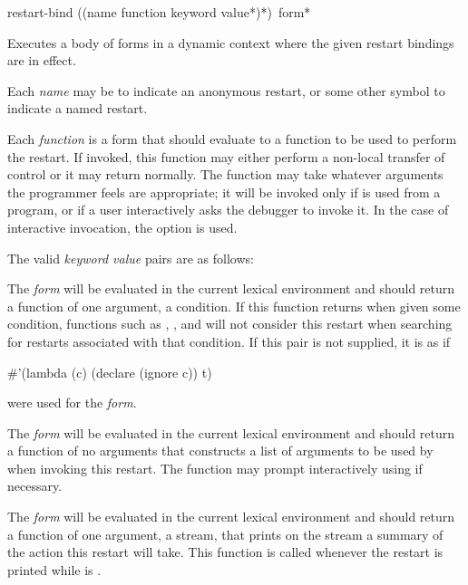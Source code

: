 \begin{defmac}
restart-bind ({(name function {keyword value}*)}*) {\,form}*

  Executes a body of forms in a dynamic context where the given restart
  bindings are in effect.

  Each \emph{name} may be  to indicate an anonymous restart, or some other symbol
  to indicate a named restart.

  Each \emph{function} is a form that
  should evaluate to a function to be used to perform the restart.
  If invoked, this function may either perform a non-local transfer of control
  or it may return normally. The function may take whatever arguments the
  programmer feels are appropriate; it will be invoked only if 
  is used from a program, or if a user interactively asks the debugger to
  invoke it. In the case of interactive invocation, the 
  option is used.


  The valid \emph{keyword value} pairs are as follows:
\begin{flushdesc}
\item[\cd{:test-function \emph{form}}]

    The \emph{form} will be evaluated in the current lexical environment and
     should return a function of one argument, a condition.
    If this function returns  when given some condition, functions such as
, , and 
will not consider this restart when searching for restarts associated with
that condition.  If this pair is not supplied, it is as if
\begin{lisp}
\#'(lambda (c) (declare (ignore c)) t)
\end{lisp}
were used for the \emph{form}.

\item[\cd{:interactive-function \emph{form}}]

     The \emph{form} will be evaluated in the current lexical environment and
     should return a function of no arguments that constructs a list
     of arguments to be used by  when invoking
     this restart. The function may prompt interactively using 
     if necessary.

\item[\cd{:report-function \emph{form}}]

     The \emph{form} will be evaluated in the current lexical environment and
     should return a function of one argument, a stream, that prints on
     the stream a summary of the action this restart will take. This
     function is called whenever the restart is printed while 
     is .
\end{flushdesc}
\end{defmac}

